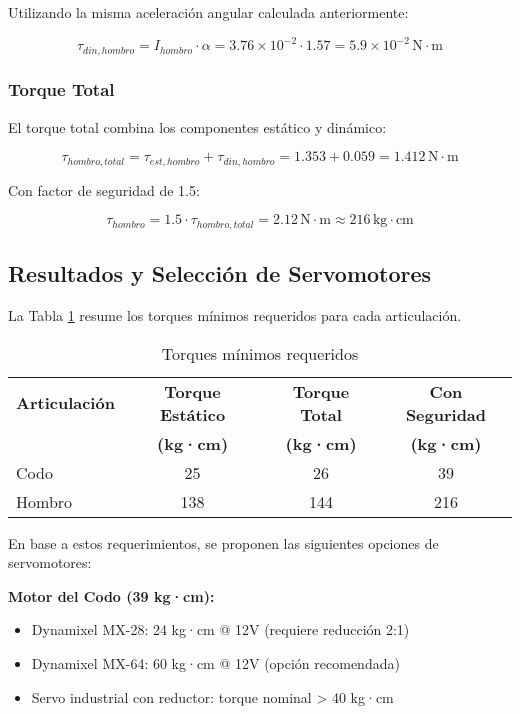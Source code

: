 Utilizando la misma aceleración angular calculada anteriormente:

\begin{equation}
\tau_{din,hombro} = I_{hombro} \cdot \alpha = 3.76 \times 10^{-2} \cdot 1.57 = 5.9 \times 10^{-2} \, \text{N} \cdot \text{m}
\end{equation}

\subsubsection{Torque Total}

El torque total combina los componentes estático y dinámico:

\begin{equation}
\tau_{hombro,total} = \tau_{est,hombro} + \tau_{din,hombro} = 1.353 + 0.059 = 1.412 \, \text{N} \cdot \text{m}
\end{equation}

Con factor de seguridad de 1.5:

\begin{equation}
\tau_{hombro} = 1.5 \cdot \tau_{hombro,total} = 2.12 \, \text{N} \cdot \text{m} \approx 216 \, \text{kg} \cdot \text{cm}
\end{equation}

\subsection{Resultados y Selección de Servomotores}

La Tabla \ref{tab:resultados_torque} resume los torques mínimos requeridos para cada articulación.

\begin{table}[h]
\centering
\caption{Torques mínimos requeridos}
\label{tab:resultados_torque}
\begin{tabular}{lccc}
\hline
\textbf{Articulación} & \textbf{Torque Estático} & \textbf{Torque Total} & \textbf{Con Seguridad} \\
 & \textbf{(kg·cm)} & \textbf{(kg·cm)} & \textbf{(kg·cm)} \\
\hline
Codo & 25 & 26 & 39 \\
Hombro & 138 & 144 & 216 \\
\hline
\end{tabular}
\end{table}

En base a estos requerimientos, se proponen las siguientes opciones de servomotores:

\textbf{Motor del Codo (39 kg·cm):}
\begin{itemize}
    \item Dynamixel MX-28: 24 kg·cm @ 12V (requiere reducción 2:1)
    \item Dynamixel MX-64: 60 kg·cm @ 12V (opción recomendada)
    \item Servo industrial con reductor: torque nominal > 40 kg·cm
\end{itemize}


